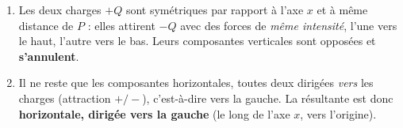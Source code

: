 \documentclass[11pt,a4paper]{article}
\begin{document}
\begin{corrige}
\begin{enumerate}[label=\alph*)]
  \item Les deux charges $+Q$ sont symétriques par rapport à l'axe $x$ et à même distance de $P$ :
        elles attirent $-Q$ avec des forces de \emph{même intensité}, l'une vers le haut, l'autre
        vers le bas. Leurs composantes verticales sont opposées et \textbf{s'annulent}.
  \item Il ne reste que les composantes horizontales, toutes deux dirigées \emph{vers} les charges
        (attraction $+/-$), c'est-à-dire vers la gauche. La résultante est donc
        \textbf{horizontale, dirigée vers la gauche} (le long de l'axe $x$, vers l'origine).
\end{enumerate}
\end{corrige}
\end{document}
